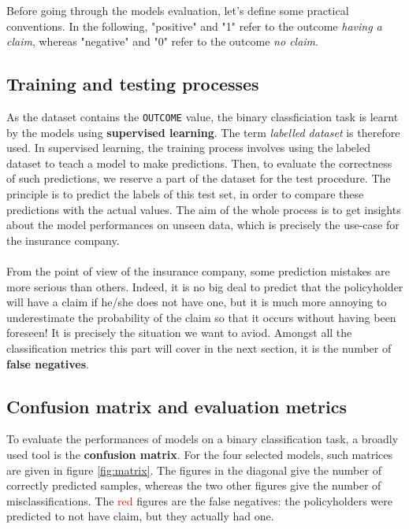 \documentclass[a4paper,11pt, titlepage]{article}
\begin{document}
Before going through the models evaluation, let's define some practical conventions. In the following, "positive" and "1" refer to the outcome \textsl{having a claim}, whereas "negative" and "0" refer to the outcome \textsl{no claim}. 

\subsection{Training and testing processes}

As the dataset contains the {\tt OUTCOME} value, the binary classficiation task is learnt by the models using \textbf{supervised learning}. The term \textsl{labelled dataset} is therefore used. In supervised learning, the training process involves using the labeled dataset to teach a model to make predictions. Then, to evaluate the correctness of such predictions, we reserve a part of the dataset for the test procedure. The principle is to predict the labels of this test set, in order to compare these predictions with the actual values. The aim of the whole process is to get insights about the model performances on unseen data, which is precisely the use-case for the insurance company.\\
\\
\noindent From the point of view of the insurance company, some prediction mistakes are more serious than others. Indeed, it is no big deal to predict that the policyholder will have a claim if he/she does not have one, but it is much more annoying to underestimate the probability of the claim so that it occurs without having been foreseen! It is precisely the situation we want to aviod. Amongst all the classification metrics this part will cover in the next section, it is the number of \textbf{false negatives}.

\subsection{Confusion matrix and evaluation metrics}

To evaluate the performances of models on a binary classification task, a broadly used tool is the \textbf{confusion matrix}. For the four selected models, such matrices are given in figure \ref{fig:matrix}. The figures in the diagonal give the number of correctly predicted samples, whereas the two other figures give the number of misclassifications. The \textcolor{red}{red} figures are the false negatives: the policyholders were predicted to not have claim, but they actually had one.
\end{document}
